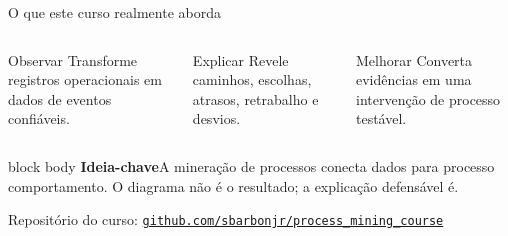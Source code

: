 \documentclass[aspectratio=169,11pt]{beamer}
\newcommand{\keyidea}[1]{%
  \begin{beamercolorbox}[rounded=true,sep=0.65em]{block body}
    \textbf{\color{Teal}Ideia-chave}\quad #1
  \end{beamercolorbox}
}
\begin{document}
\begin{frame}{O que este curso realmente aborda}
  \begin{columns}[T,onlytextwidth]
      \begin{block}{Observar}
        Transforme registros operacionais em dados de eventos confiáveis.
      \end{block}
      \begin{block}{Explicar}
        Revele caminhos, escolhas, atrasos, retrabalho e desvios.
      \end{block}
      \begin{block}{Melhorar}
        Converta evidências em uma intervenção de processo testável.
      \end{block}
  \end{columns}
  \vspace{0.55cm}
  \keyidea{A mineração de processos conecta \alert{dados} para \alert{processo comportamento}.
  O diagrama não é o resultado; a explicação defensável é.}
  \vspace{0.3cm}
  \begin{center}
    \small\color{SoftGray}Repositório do curso:\quad
    \href{https://github.com/sbarbonjr/process_mining_course}{\color{Teal}\texttt{github.com/sbarbonjr/process\_mining\_course}}
  \end{center}
\end{frame}
\end{document}
